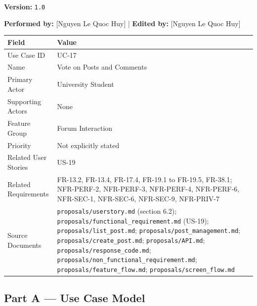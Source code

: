 \documentclass[12pt]{article}
\renewcommand{\baselinestretch}{1.5}
\begin{document}
\textbf{Version:} \texttt{1.0}
\par\medskip

\textbf{Performed by:} [Nguyen Le Quoc Huy] | \textbf{Edited by:} [Nguyen Le Quoc Huy]
\par\medskip

\begingroup
\small
\renewcommand{\baselinestretch}{1.0}\selectfont
\renewcommand{\arraystretch}{1.15}
\setlength{\tabcolsep}{6pt}
\begin{longtable}{|>{\raggedright\arraybackslash}p{}|>{\raggedright\arraybackslash}p{}|}
\hline
\textbf{Field} & \textbf{Value} \\ \hline
\endhead
Use Case ID & UC-17 \\ \hline
Name & Vote on Posts and Comments \\ \hline
Primary Actor & University Student \\ \hline
Supporting Actors & None \\ \hline
Feature Group & Forum Interaction \\ \hline
Priority & Not explicitly stated \\ \hline
Related User Stories & US-19 \\ \hline
Related Requirements & FR-13.2, FR-13.4, FR-17.4, FR-19.1 to FR-19.5, FR-38.1; NFR-PERF-2, NFR-PERF-3, NFR-PERF-4, NFR-PERF-6, NFR-SEC-1, NFR-SEC-6, NFR-SEC-9, NFR-PRIV-7 \\ \hline
Source Documents & \texttt{proposals/userstory.md} (section 6.2); \texttt{proposals/functional\_requirement.md} (US-19); \texttt{proposals/list\_post.md}; \texttt{proposals/post\_management.md}; \texttt{proposals/create\_post.md}; \texttt{proposals/API.md}; \texttt{proposals/response\_code.md}; \texttt{proposals/non\_functional\_requirement.md}; \texttt{proposals/feature\_flow.md}; \texttt{proposals/screen\_flow.md} \\ \hline
\end{longtable}
\endgroup
\par\medskip

\hypertarget{sec:part-a-use-case-model}{}
\subsection*{Part A --- Use Case Model}
\par\medskip

\hypertarget{sec:a1-focused-use-case-diagram}{}
\end{document}
